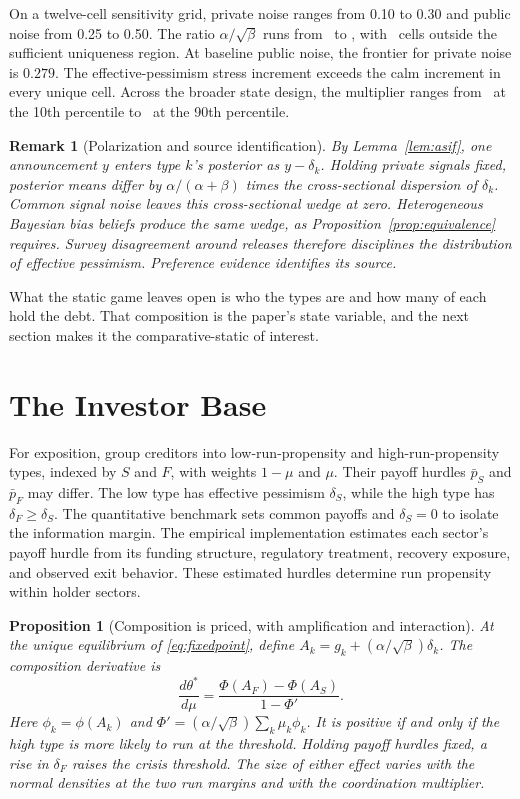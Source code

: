 \documentclass[11pt]{article}
\newtheorem{proposition}{Proposition}
\newtheorem{remark}{Remark}
\theoremstyle{definition}
\begin{document}
On a twelve-cell sensitivity grid, private noise ranges from 0.10 to 0.30 and public noise from 0.25 to 0.50. The ratio $\alpha/\sqrt\beta$ runs from \RatioGridLo\ to \RatioGridHi, with \CellsNonUnique\ cells outside the sufficient uniqueness region. At baseline public noise, the frontier for private noise is $0.279$. The effective-pessimism stress increment exceeds the calm increment in every unique cell. Across the broader state design, the multiplier ranges from \MultPten\ at the 10th percentile to \MultPninety\ at the 90th percentile.

\begin{remark}[Polarization and source identification]\label{rem:polarization}
By Lemma~\ref{lem:asif}, one announcement $y$ enters type $k$'s posterior as $y-\delta_k$. Holding private signals fixed, posterior means differ by $\alpha/(\alpha+\beta)$ times the cross-sectional dispersion of $\delta_k$. Common signal noise leaves this cross-sectional wedge at zero. Heterogeneous Bayesian bias beliefs produce the same wedge, as Proposition~\ref{prop:equivalence} requires. Survey disagreement around releases therefore disciplines the distribution of effective pessimism. Preference evidence identifies its source.
\end{remark}

What the static game leaves open is who the types are and how many of each hold the debt. That composition is the paper's state variable, and the next section makes it the comparative-static of interest.

\section{The Investor Base}\label{sec:base}

For exposition, group creditors into low-run-propensity and high-run-propensity types, indexed by $S$ and $F$, with weights $1-\mu$ and $\mu$. Their payoff hurdles $\bar p_S$ and $\bar p_F$ may differ. The low type has effective pessimism $\delta_S$, while the high type has $\delta_F\geq\delta_S$. The quantitative benchmark sets common payoffs and $\delta_S=0$ to isolate the information margin. The empirical implementation estimates each sector's payoff hurdle from its funding structure, regulatory treatment, recovery exposure, and observed exit behavior. These estimated hurdles determine run propensity within holder sectors.

\begin{proposition}[Composition is priced, with amplification and interaction]\label{prop:base}
At the unique equilibrium of \eqref{eq:fixedpoint}, define $A_k=g_k+(\alpha/\sqrt\beta)\delta_k$. The composition derivative is
\[
\frac{d\theta^*}{d\mu}=\frac{\Phi(A_F)-\Phi(A_S)}{1-\Phi'}.
\]
Here $\phi_k=\phi(A_k)$ and $\Phi'=(\alpha/\sqrt\beta)\sum_k\mu_k\phi_k$.
It is positive if and only if the high type is more likely to run at the threshold. Holding payoff hurdles fixed, a rise in $\delta_F$ raises the crisis threshold. The size of either effect varies with the normal densities at the two run margins and with the coordination multiplier.
\end{proposition}
\end{document}
